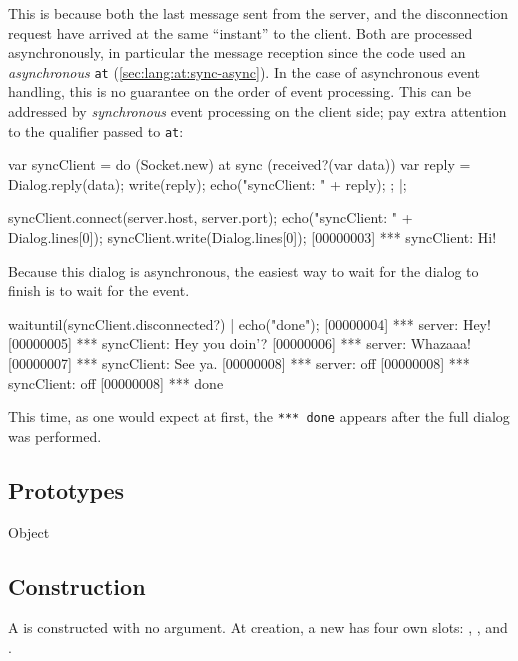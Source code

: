 This is because both the last message sent from the server, and the
disconnection request have arrived at the same ``instant'' to the client.
Both are processed asynchronously, in particular the message reception since
the code used an \emph{asynchronous} \lstinline{at}
(\autoref{sec:lang:at:sync-async}).  In the case of asynchronous event
handling, this is no guarantee on the order of event processing.  This can
be addressed by \emph{synchronous} event processing on the client side; pay
extra attention to the  qualifier passed to \lstinline{at}:

\begin{urbiscript}
var syncClient =
  do (Socket.new)
  {
    at sync (received?(var data))
    {
      var reply = Dialog.reply(data);
      write(reply);
      echo("syncClient: " + reply);
    };
  }|;

syncClient.connect(server.host, server.port);
echo("syncClient: " + Dialog.lines[0]);
syncClient.write(Dialog.lines[0]);
[00000003] *** syncClient: Hi!
\end{urbiscript}

Because this dialog is asynchronous, the easiest way to wait for the dialog
to finish is to wait for the  event.

\begin{urbiscript}
waituntil(syncClient.disconnected?) | echo("done");
[00000004] *** server: Hey!
[00000005] *** syncClient: Hey you doin'?
[00000006] *** server: Whazaaa!
[00000007] *** syncClient: See ya.
[00000008] *** server: off
[00000008] *** syncClient: off
[00000008] *** done
\end{urbiscript}

\noindent
This time, as one would expect at first, the \lstinline{*** done} appears
after the full dialog was performed.


\subsection{Prototypes}
\begin{refObjects}
\item[Object]
\end{refObjects}

\subsection{Construction}

A  is constructed with no argument. At creation, a
new  has four own slots: ,
,  and .

